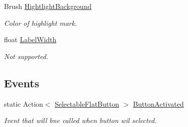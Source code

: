\begin{DoxyCompactItemize}
Brush \mbox{\hyperlink{class_wpf_handler_1_1_u_i_1_1_controls_1_1_selectable_flat_button_ac6e0b3d04d913327eb3b8482a48453d7}{Hightlight\+Background}}
\begin{DoxyCompactList}\small\item\em Color of highlight mark. \end{DoxyCompactList}\item 
float \mbox{\hyperlink{class_wpf_handler_1_1_u_i_1_1_controls_1_1_selectable_flat_button_a926a0f181d6faec84ca8877467604100}{Label\+Width}}
\begin{DoxyCompactList}\small\item\em Not supported. \end{DoxyCompactList}\end{DoxyCompactItemize}
\subsection*{Events}
\begin{DoxyCompactItemize}
\item 
static Action$<$ \mbox{\hyperlink{class_wpf_handler_1_1_u_i_1_1_controls_1_1_selectable_flat_button}{Selectable\+Flat\+Button}} $>$ \mbox{\hyperlink{class_wpf_handler_1_1_u_i_1_1_controls_1_1_selectable_flat_button_aa36bac42f7eef1ba46a8a5dc8f071c19}{Button\+Activated}}
\begin{DoxyCompactList}\small\item\em Ivent that will bne called when button wil selected. \end{DoxyCompactList}\end{DoxyCompactItemize}

